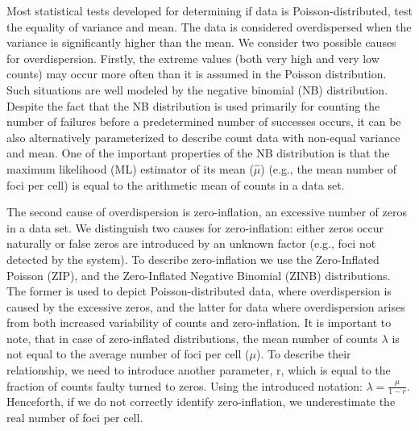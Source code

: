 
Most statistical tests developed for determining if data is Poisson-distributed, test the equality of variance and mean. The data is considered overdispersed when the variance is significantly higher than the mean. We consider two possible causes for overdispersion. Firstly, the extreme values (both very high and very low counts) may occur more often than it is assumed in the Poisson distribution. Such situations are well modeled by the negative binomial (NB) distribution. Despite the fact that the NB distribution is used primarily for counting the number of failures before a predetermined number of successes occurs, it can be also alternatively parameterized to describe count data with non-equal variance and mean. One of the important properties of the NB distribution is that the maximum likelihood (ML) estimator of its mean ($\hat{\mu}$) (e.g., the mean number of foci per cell) is equal to the arithmetic mean of counts in a data set.

The second cause of overdispersion is zero-inflation, an excessive number of zeros in a data set. We distinguish two causes for zero-inflation: either zeros occur naturally or false zeros are introduced by an unknown factor (e.g., foci not detected by the system). To describe zero-inflation we use the Zero-Inflated Poisson (ZIP), and the Zero-Inflated Negative Binomial (ZINB) distributions. The former is used to depict Poisson-distributed data, where overdispersion is caused by the excessive zeros, and the latter for data where overdispersion arises from both increased variability of counts and zero-inflation. It is important to note, that in case of zero-inflated distributions, the mean number of counts $\lambda$ is not equal to the average number of foci per cell ($\mu$). To describe their relationship, we need to introduce another parameter, r, which is equal to the fraction of counts faulty turned to zeros. Using the introduced notation: $\lambda = \frac{\mu}{1 - r}$. Henceforth, if we do not correctly identify zero-inflation, we underestimate the real number of foci per cell.

